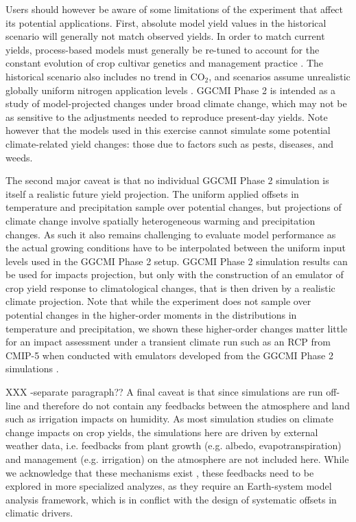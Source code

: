 \documentclass[gmd, manuscript]{copernicus} %
\begin{document}
Users should however be aware of some limitations of the experiment that affect its potential applications. 
First, absolute model yield values in the historical scenario will generally not match observed yields. 
In order to match current yields, process-based models must generally be re-tuned to account for the constant evolution of crop cultivar genetics and management practice \citep[e.g.][]{JONES2017b}. 
The historical scenario also includes no trend in CO$_2$, and scenarios assume unrealistic globally uniform nitrogen application levels \citep{Elliott2015}. 
GGCMI Phase 2 is intended as a study of model-projected changes under broad climate change, which may not be as sensitive to the adjustments needed to reproduce present-day yields. 
Note however that the models used in this exercise cannot simulate some potential climate-related yield changes: those due to factors such as pests, diseases, and weeds.

The second major caveat is that no individual GGCMI Phase 2 simulation is itself a realistic future yield projection. 
The uniform applied offsets in temperature and precipitation sample over potential changes, but projections of climate change involve spatially heterogeneous warming and precipitation changes. 
As such it also remains challenging to evaluate model performance as the actual growing conditions have to be interpolated between the uniform input levels used in the GGCMI Phase 2 setup. 
GGCMI Phase 2 simulation results can be used for impacts projection, but only with the construction of an emulator of crop yield response to climatological changes, that is then driven by a realistic climate projection.
Note that while the experiment does not sample over potential changes in the higher-order moments in the distributions in temperature and precipitation, we shown these higher-order changes matter little for an impact assessment under a transient climate run such as an RCP from CMIP-5 when conducted with emulators developed from the GGCMI Phase 2 simulations \citep{Franke2020}.

XXX -separate paragraph?? A final caveat is that since simulations are run off-line and therefore do not contain any feedbacks between the atmosphere and land such as irrigation impacts on humidity.
As most simulation studies on climate change impacts on crop yields, the simulations here are driven by external weather data, i.e. feedbacks from plant growth (e.g. albedo, evapotranspiration) and management (e.g. irrigation) on the atmosphere are not included here. 
While we acknowledge that these mechanisms exist \citep[e.g.][]{Decker2017}, these feedbacks need to be explored in more specialized analyzes, as they require an Earth-system model analysis framework, which is in conflict with the design of systematic offsets in climatic drivers.
\end{document}
